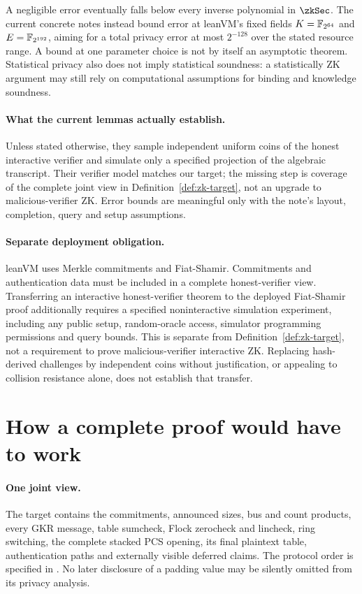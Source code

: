 \documentclass[11pt]{article}
\theoremstyle{definition}
\begin{document}
A negligible error eventually falls below every inverse polynomial in $\zkSec$. The current concrete notes instead bound error at leanVM's fixed fields $K=\mathbb{F}_{2^{64}}$ and $E=\mathbb{F}_{2^{192}}$, aiming for a total privacy error at most $2^{-128}$ over the stated resource range. A bound at one parameter choice is not by itself an asymptotic theorem. Statistical privacy also does not imply statistical soundness: a statistically ZK argument may still rely on computational assumptions for binding and knowledge soundness.

\paragraph{What the current lemmas actually establish.} Unless stated otherwise, they sample independent uniform coins of the honest interactive verifier and simulate only a specified projection of the algebraic transcript. Their verifier model matches our target; the missing step is coverage of the complete joint view in Definition~\ref{def:zk-target}, not an upgrade to malicious-verifier ZK. Error bounds are meaningful only with the note's layout, completion, query and setup assumptions.

\paragraph{Separate deployment obligation.} leanVM uses Merkle commitments and Fiat-Shamir. Commitments and authentication data must be included in a complete honest-verifier view. Transferring an interactive honest-verifier theorem to the deployed Fiat-Shamir proof additionally requires a specified noninteractive simulation experiment, including any public setup, random-oracle access, simulator programming permissions and query bounds. This is separate from Definition~\ref{def:zk-target}, not a requirement to prove malicious-verifier interactive ZK. Replacing hash-derived challenges by independent coins without justification, or appealing to collision resistance alone, does not establish that transfer.

\section{How a complete proof would have to work}\label{sec:zk-composition}

\paragraph{One joint view.} The target contains the commitments, announced sizes, bus and count products, every GKR message, table sumcheck, Flock zerocheck and lincheck, ring switching, the complete stacked PCS opening, its final plaintext table, authentication paths and externally visible deferred claims. The protocol order is specified in . No later disclosure of a padding value may be silently omitted from its privacy analysis.
\end{document}
